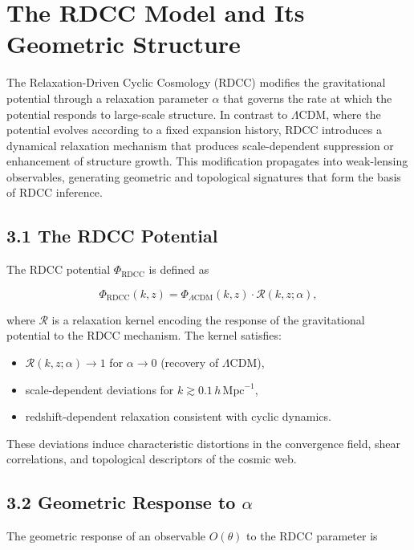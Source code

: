 \documentclass[11pt,a4paper]{article}
\begin{document}
\section{The RDCC Model and Its Geometric Structure}

The Relaxation-Driven Cyclic Cosmology (RDCC) modifies the gravitational 
potential through a relaxation parameter $\alpha$ that governs the rate at which 
the potential responds to large-scale structure. In contrast to $\Lambda$CDM, 
where the potential evolves according to a fixed expansion history, RDCC 
introduces a dynamical relaxation mechanism that produces scale-dependent 
suppression or enhancement of structure growth. This modification propagates 
into weak-lensing observables, generating geometric and topological signatures 
that form the basis of RDCC inference.

\subsection*{3.1 The RDCC Potential}

The RDCC potential $\Phi_{\mathrm{RDCC}}$ is defined as


\[
    \Phi_{\mathrm{RDCC}}(k, z)
    =
    \Phi_{\Lambda\mathrm{CDM}}(k, z)
    \cdot
    \mathcal{R}(k, z; \alpha),
\]


where $\mathcal{R}$ is a relaxation kernel encoding the response of the 
gravitational potential to the RDCC mechanism. The kernel satisfies:

\begin{itemize}
    \item $\mathcal{R}(k, z; \alpha) \to 1$ for $\alpha \to 0$ (recovery of $\Lambda$CDM),
    \item scale-dependent deviations for $k \gtrsim 0.1\,h\,\mathrm{Mpc}^{-1}$,
    \item redshift-dependent relaxation consistent with cyclic dynamics.
\end{itemize}

These deviations induce characteristic distortions in the convergence field, 
shear correlations, and topological descriptors of the cosmic web.

\subsection*{3.2 Geometric Response to $\alpha$}

The geometric response of an observable $O(\theta)$ to the RDCC parameter is
\end{document}
